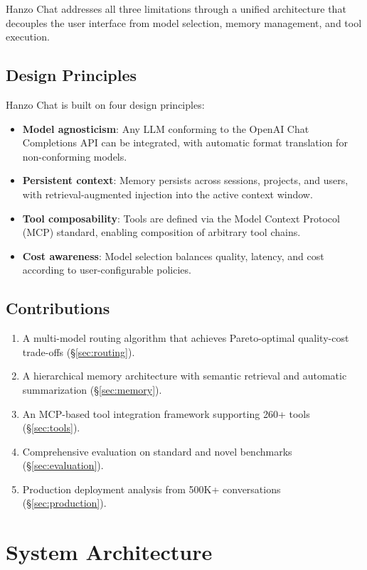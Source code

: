 \documentclass[11pt,twocolumn]{article}
\begin{document}
Hanzo Chat addresses all three limitations through a unified architecture that decouples the user interface from model selection, memory management, and tool execution.

\subsection{Design Principles}

Hanzo Chat is built on four design principles:

\begin{itemize}[leftmargin=1.1em]
    \item \textbf{Model agnosticism}: Any LLM conforming to the OpenAI Chat Completions API can be integrated, with automatic format translation for non-conforming models.
    \item \textbf{Persistent context}: Memory persists across sessions, projects, and users, with retrieval-augmented injection into the active context window.
    \item \textbf{Tool composability}: Tools are defined via the Model Context Protocol (MCP) standard, enabling composition of arbitrary tool chains.
    \item \textbf{Cost awareness}: Model selection balances quality, latency, and cost according to user-configurable policies.
\end{itemize}

\subsection{Contributions}

\begin{enumerate}[leftmargin=1.4em]
    \item A multi-model routing algorithm that achieves Pareto-optimal quality-cost trade-offs (\S\ref{sec:routing}).
    \item A hierarchical memory architecture with semantic retrieval and automatic summarization (\S\ref{sec:memory}).
    \item An MCP-based tool integration framework supporting 260+ tools (\S\ref{sec:tools}).
    \item Comprehensive evaluation on standard and novel benchmarks (\S\ref{sec:evaluation}).
    \item Production deployment analysis from 500K+ conversations (\S\ref{sec:production}).
\end{enumerate}

\section{System Architecture}
\label{sec:architecture}
\end{document}
